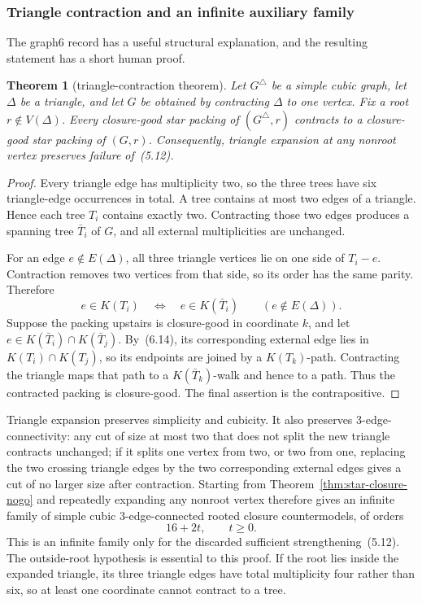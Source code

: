 \documentclass[11pt]{article}
\newtheorem{theorem}{Theorem}[section]
\theoremstyle{definition}
\theoremstyle{remark}
\newcommand{\1}{\mathbf 1}
\begin{document}
\subsubsection*{Triangle contraction and an infinite auxiliary family}

The graph6 record has a useful structural explanation, and the resulting
statement has a short human proof.

\begin{theorem}[triangle-contraction theorem]
\label{thm:triangle-contraction}
Let \(G^\triangle\) be a simple cubic graph, let \(\Delta\) be a triangle,
and let \(G\) be obtained by contracting \(\Delta\) to one vertex.  Fix a
root \(r\notin V(\Delta)\).  Every closure-good star packing of
\((G^\triangle,r)\) contracts to a closure-good star packing of \((G,r)\).
Consequently, triangle expansion at any nonroot vertex preserves failure
of~(5.12).
\end{theorem}

\begin{proof}
Every triangle edge has multiplicity two, so the three trees have six
triangle-edge occurrences in total.  A tree contains at most two edges of
a triangle.  Hence each tree \(T_i\) contains exactly two.  Contracting
those two edges produces a spanning tree \(\bar T_i\) of \(G\), and all
external multiplicities are unchanged.

For an edge \(e\notin E(\Delta)\), all three triangle vertices lie on one
side of \(T_i-e\).  Contraction removes two vertices from that side, so its
order has the same parity.  Therefore
\[
 e\in K(T_i)\quad\Longleftrightarrow\quad
 e\in K(\bar T_i) \qquad(e\notin E(\Delta)).              \tag{6.14}
\]
Suppose the packing upstairs is closure-good in coordinate \(k\), and
let \(e\in K(\bar T_i)\cap K(\bar T_j)\).  By~(6.14), its corresponding
external edge lies in \(K(T_i)\cap K(T_j)\), so its endpoints are joined
by a \(K(T_k)\)-path.  Contracting the triangle maps that path to a
\(K(\bar T_k)\)-walk and hence to a path.  Thus the contracted packing is
closure-good.  The final assertion is the contrapositive.
\end{proof}

Triangle expansion preserves simplicity and cubicity.  It also preserves
3-edge-connectivity: any cut of size at most two that does not split the
new triangle contracts unchanged; if it splits one vertex from two, or two
from one, replacing the two crossing triangle edges by the two corresponding
external edges gives a cut of no larger size after contraction.  Starting
from Theorem~\ref{thm:star-closure-nogo} and repeatedly expanding any
nonroot vertex therefore gives an infinite family of simple cubic
3-edge-connected rooted closure countermodels, of orders
\[
 16+2t,\qquad t\geq0.                                    \tag{6.15}
\]
This is an infinite family only for the discarded sufficient
strengthening~(5.12).  The outside-root hypothesis is essential to this
proof.  If the root lies inside the expanded triangle, its three triangle
edges have total multiplicity four rather than six, so at least one
coordinate cannot contract to a tree.
\end{document}
